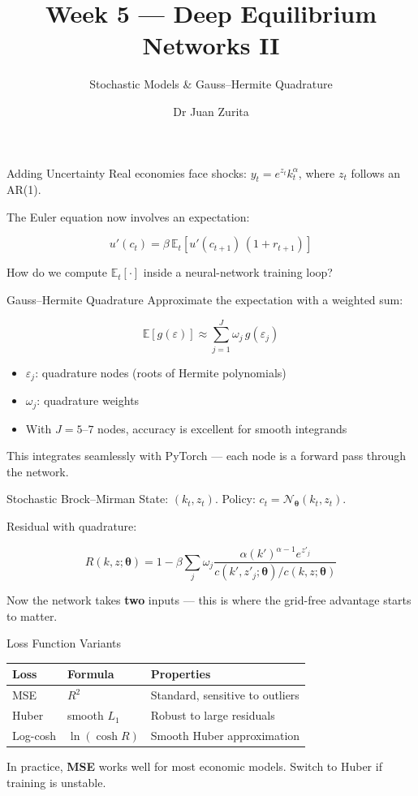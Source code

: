 \documentclass[aspectratio=169, 10pt]{beamer}
\title{Week 5 --- Deep Equilibrium Networks II}
\subtitle{Stochastic Models \& Gauss--Hermite Quadrature}
\author{Dr Juan Zurita}
\institute{Deep Learning for Macroeconomics\\
The University of Edinburgh~$\cdot$~School of Economics}
\date{}
\begin{document}
\maketitle

\begin{frame}{Adding Uncertainty}
Real economies face shocks: $y_t = e^{z_t} k_t^\alpha$, where $z_t$ follows an AR(1).

\bigskip
The Euler equation now involves an \alert{expectation}:

$$u'(c_t) = \beta\,\mathbb{E}_t\!\left[u'(c_{t+1})\,(1 + r_{t+1})\right]$$

\bigskip
How do we compute $\mathbb{E}_t[\cdot]$ inside a neural-network training loop?
\end{frame}

\begin{frame}{Gauss--Hermite Quadrature}
Approximate the expectation with a weighted sum:

$$\mathbb{E}[g(\varepsilon)] \approx \sum_{j=1}^{J} \omega_j\,g(\varepsilon_j)$$

\bigskip
\begin{itemize}
\item $\varepsilon_j$: quadrature nodes (roots of Hermite polynomials)
\item $\omega_j$: quadrature weights
\item With $J = 5$--$7$ nodes, accuracy is excellent for smooth integrands
\end{itemize}

\bigskip
This integrates seamlessly with PyTorch --- each node is a forward pass through the network.
\end{frame}

\begin{frame}{Stochastic Brock--Mirman}
State: $(k_t, z_t)$. Policy: $c_t = \mathcal{N}_{\boldsymbol{\theta}}(k_t, z_t)$.

\bigskip
Residual with quadrature:

$$R(k,z; \boldsymbol{\theta}) = 1 - \beta \sum_j \omega_j \frac{\alpha (k')^{\alpha-1} e^{z'_j}}{c(k', z'_j; \boldsymbol{\theta}) / c(k,z; \boldsymbol{\theta})}$$

\bigskip
Now the network takes \textbf{two} inputs --- this is where the grid-free advantage starts to matter.
\end{frame}

\begin{frame}{Loss Function Variants}
\begin{center}
\begin{tabular}{lll}
\toprule
Loss & Formula & Properties \\
\midrule
MSE & $R^2$ & Standard, sensitive to outliers \\
Huber & smooth $L_1$ & Robust to large residuals \\
Log-cosh & $\ln(\cosh R)$ & Smooth Huber approximation \\
\bottomrule
\end{tabular}
\end{center}

\bigskip
In practice, \textbf{MSE} works well for most economic models. Switch to Huber if training is unstable.
\end{frame}
\end{document}
